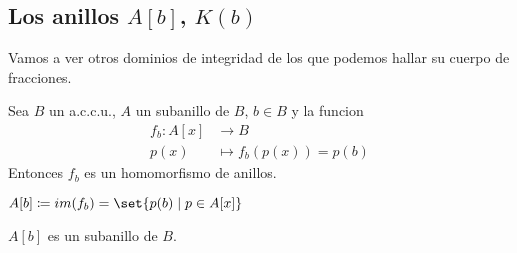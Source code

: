 \subsection{Los anillos \(A[b ]\), \(K(b )\)}
Vamos a ver otros dominios de integridad de los que podemos hallar su cuerpo de fracciones.

\begin{proposition}
	Sea \(B \) un a.c.c.u., \(A \) un subanillo de \(B \), \(b \in B \) y la funcion
	\[
		\begin{aligned}
			f_b \colon A[x ] & \longrightarrow B                \\
			p(x )            & \longmapsto f_b (p(x )) = p(b )
		\end{aligned}
	\]
	Entonces \(f_b \) es un homomorfismo de anillos.
\end{proposition}
\begin{definition}
	\(A[b] \coloneqq im(f_b) = \set{p(b) \mid p \in A[x ]}\)
\end{definition}
\begin{corollary}
	\(A[b ]\) es un subanillo de \(B \).
\end{corollary}

